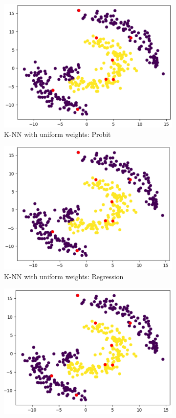 \documentclass[12pt]{amsart}
\begin{document}
    \begin{figure}[ht] 
  \begin{subfigure}{0.475\linewidth}
    \centering
    \includegraphics[width=0.8\linewidth]{Figures/SpiKNNUniPro.png} 
    \caption{K-NN with uniform weights: Probit} 
    \label{Fig:SpiKNNUniPro} 
  \end{subfigure}%
  \begin{subfigure}{0.475\linewidth}
    \centering
    \includegraphics[width=0.8\linewidth]{Figures/SpiKNNUniReg.png} 
    \caption{K-NN with uniform weights: Regression} 
    \label{Fig:SpiKNNUniReg} 
  \end{subfigure} 
    \begin{subfigure}{0.475\linewidth}
    \centering
    \includegraphics[width=0.8\linewidth]{Figures/SpiKNNRBFPro.png} 

\end{subfigure}
\end{figure}
\end{document}
